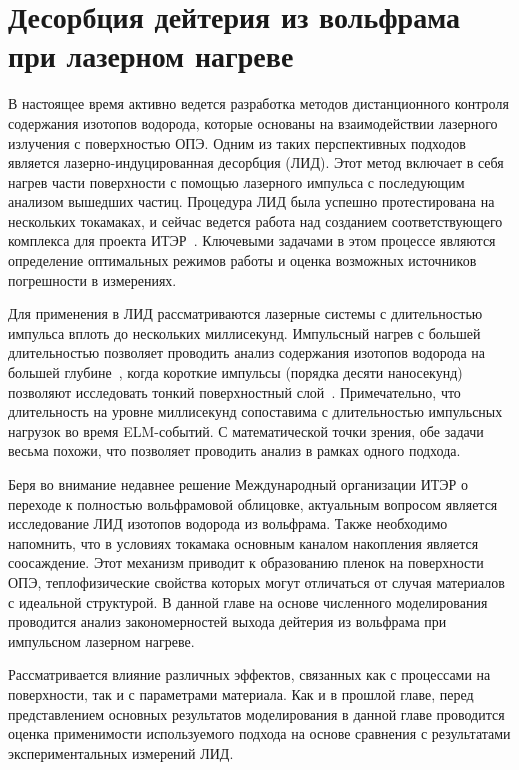 \chapter{Десорбция дейтерия из вольфрама при лазерном нагреве}\label{ch:ch4}

В настоящее время активно ведется разработка методов дистанционного контроля содержания изотопов водорода, которые основаны на взаимодействии лазерного излучения с поверхностью ОПЭ. Одним из таких перспективных подходов является лазерно-индуцированная десорбция (ЛИД). Этот метод включает в себя нагрев части поверхности с помощью лазерного импульса с последующим анализом вышедших частиц. Процедура ЛИД была успешно протестирована на нескольких токамаках, и сейчас ведется работа над созданием соответствующего комплекса для проекта ИТЭР~\cite{Zlobinski2024}. Ключевыми задачами в этом процессе являются определение оптимальных режимов работы и оценка возможных источников погрешности в измерениях.

Для применения в ЛИД рассматриваются лазерные системы с длительностью импульса вплоть до нескольких миллисекунд. Импульсный нагрев с большей длительностью позволяет проводить анализ содержания изотопов водорода на большей глубине~\cite{Yu2019, Zlobinski2020}, когда короткие импульсы (порядка десяти наносекунд) позволяют исследовать тонкий поверхностный слой~\cite{Gasparyan2021}. Примечательно, что длительность на уровне миллисекунд сопоставима с длительностью импульсных нагрузок во время ELM-событий. С математической точки зрения, обе задачи весьма похожи, что позволяет проводить анализ в рамках одного подхода.

Беря во внимание недавнее решение Международный организации ИТЭР о переходе к полностью вольфрамовой облицовке, актуальным вопросом является исследование ЛИД изотопов водорода из вольфрама. Также необходимо напомнить, что в условиях токамака основным каналом накопления является соосаждение. Этот механизм приводит к образованию пленок на поверхности ОПЭ, теплофизические свойства которых могут отличаться от случая материалов с идеальной структурой. В данной главе на основе численного моделирования проводится анализ закономерностей выхода дейтерия из вольфрама при импульсном лазерном нагреве.

Рассматривается влияние различных эффектов, связанных как с процессами на поверхности, так и с параметрами материала. Как и в прошлой главе, перед представлением основных результатов моделирования в данной главе проводится оценка применимости используемого подхода на основе сравнения с результатами экспериментальных измерений ЛИД. 

